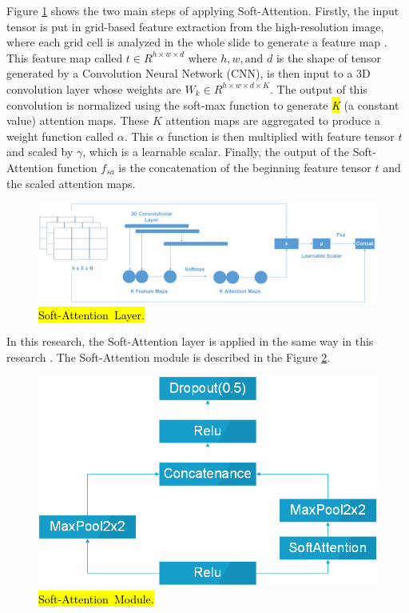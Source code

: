 \documentclass[sensors,article,accept,pdftex,moreauthors]{Definitions/mdpi}
\begin{document}
	Figure \ref{fig:soft-attention} shows the two main steps of applying Soft-Attention. Firstly, the input tensor is put in grid-based feature extraction from the high-resolution image, where each grid cell is analyzed in the whole slide to generate a feature map \cite{08513}. This feature map called $t \in R^{h \times w \times d}$ where $h, w, \text{and } d$ is the shape of tensor generated by a Convolution Neural Network (CNN), is then input to a 3D convolution layer whose weights are $W_k \in R^{h \times w \times d \times K}$. The output of this convolution is normalized using the soft-max function to generate \hl{\textit{K}} %
 (a constant value) attention maps. These $K$ attention maps are aggregated to produce a weight function called $\alpha$. This $\alpha$ function is then multiplied with feature tensor $t$ and scaled by $\gamma$, which is a learnable scalar. Finally, the output of the Soft-Attention function $f_{sa}$ is the concatenation of the beginning feature tensor $t$ and the scaled attention maps. 
	
	\begin{figure}[H]
		\includegraphics[width=1\linewidth]{Definitions/SoftAttention}
		\caption{\hl{Soft-Attention~Layer.} %
}
		\label{fig:soft-attention}
	\end{figure}
	
	In this research, the Soft-Attention layer is applied in the same way in this research \cite{03358}. The Soft-Attention module is described in the Figure \ref{fig:soft-attention-block}. 
	
	\begin{figure}[H]
		\includegraphics[width=0.5\linewidth]{Definitions/SoftAttentionBlock}
		\caption{\hl{Soft-Attention~Module.} %
}
		\label{fig:soft-attention-block}
	\end{figure}
	
\end{document}
